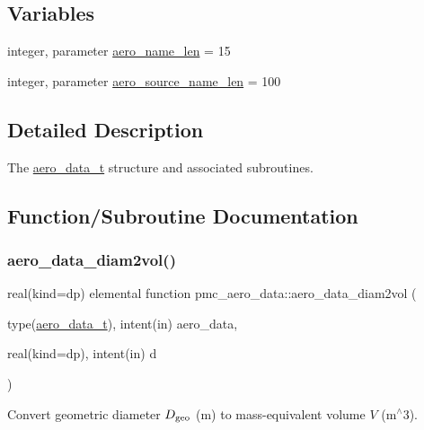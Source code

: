 \subsection*{Variables}
\begin{DoxyCompactItemize}
\item 
integer, parameter \mbox{\hyperlink{namespacepmc__aero__data_a05ba86cdbb1bbbacbbc41cce6eba6474}{aero\+\_\+name\+\_\+len}} = 15
\item 
integer, parameter \mbox{\hyperlink{namespacepmc__aero__data_adceb28b9bf685995bdcb53cacb52ee42}{aero\+\_\+source\+\_\+name\+\_\+len}} = 100
\end{DoxyCompactItemize}


\subsection{Detailed Description}
The \mbox{\hyperlink{structpmc__aero__data_1_1aero__data__t}{aero\+\_\+data\+\_\+t}} structure and associated subroutines. 

\subsection{Function/\+Subroutine Documentation}
\mbox{\label{namespacepmc__aero__data_a2e6484e2aeeb8aea7f9362d52ab7d32d}} 
\subsubsection{\texorpdfstring{aero\+\_\+data\+\_\+diam2vol()}{aero\_data\_diam2vol()}}
{\footnotesize\ttfamily real(kind=dp) elemental function pmc\+\_\+aero\+\_\+data\+::aero\+\_\+data\+\_\+diam2vol (\begin{DoxyParamCaption}\item[{type(\mbox{\hyperlink{structpmc__aero__data_1_1aero__data__t}{aero\+\_\+data\+\_\+t}}), intent(in)}]{aero\+\_\+data,  }\item[{real(kind=dp), intent(in)}]{d }\end{DoxyParamCaption})}



Convert geometric diameter $D_{\rm geo}$ (m) to mass-\/equivalent volume $V$ (m$^\wedge$3). 


